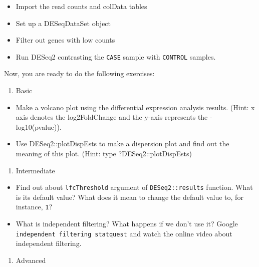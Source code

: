\documentclass[12pt,]{krantz}
\providecommand{\tightlist}{%
  \setlength{\itemsep}{0pt}\setlength{\parskip}{0pt}}
\begin{document}
\begin{itemize}
\tightlist
\item
  Import the read counts and colData tables
\item
  Set up a DESeqDataSet object
\item
  Filter out genes with low counts
\item
  Run DESeq2 contrasting the \texttt{CASE} sample with \texttt{CONTROL} samples.
\end{itemize}

Now, you are ready to do the following exercises:

\begin{enumerate}
\def\labelenumi{\arabic{enumi}.}
\tightlist
\item
  Basic
\end{enumerate}

\begin{itemize}
\tightlist
\item
  Make a volcano plot using the differential expression analysis results. (Hint: x axis denotes the log2FoldChange and the y-axis represents the -log10(pvalue)).\\
\item
  Use DESeq2::plotDispEsts to make a dispersion plot and find out the meaning of this plot. (Hint: type ?DESeq2::plotDispEsts)
\end{itemize}

\begin{enumerate}
\def\labelenumi{\arabic{enumi}.}
\setcounter{enumi}{1}
\tightlist
\item
  Intermediate
\end{enumerate}

\begin{itemize}
\item
  Find out about \texttt{lfcThreshold} argument of \texttt{DESeq2::results} function. What is its default value? What does it mean to change the default value to, for instance, \texttt{1}?
\item
  What is independent filtering? What happens if we don't use it? Google \texttt{independent\ filtering\ statquest} and watch the online video about independent filtering.
\end{itemize}

\begin{enumerate}
\def\labelenumi{\arabic{enumi}.}
\setcounter{enumi}{2}
\tightlist
\item
  Advanced
\end{enumerate}
\end{document}
